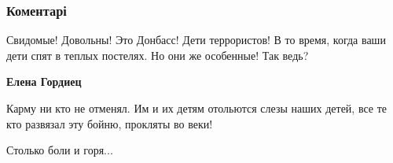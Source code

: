  
 
 
 
 
\subsubsection{Коментарі}
\label{sec:01_12_2021.fb.zhuravko_aleksej.3.vojna_mir.cmt}

\begin{itemize} %

Свидомые! Довольны! Это Донбасс! Дети террористов! В то время, когда ваши дети
спят в теплых постелях. Но они же особенные! Так ведь?

\textbf{Елена Гордиец}

Карму ни кто не отменял. Им и их детям отольются слезы наших детей, все те кто
развязал эту бойню, прокляты во веки!

Столько боли и горя...
\end{itemize} %
